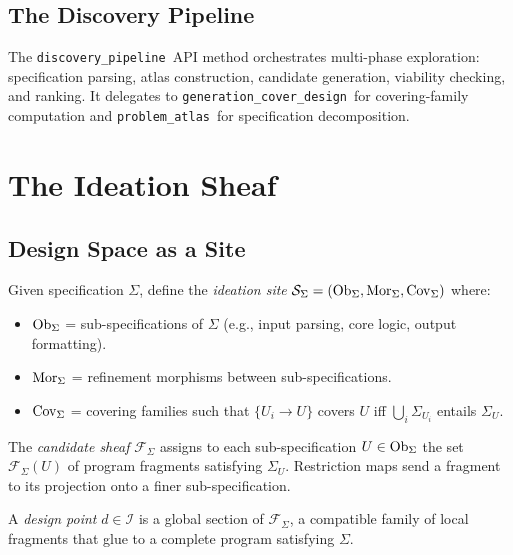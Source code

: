 \documentclass[11pt]{article}
\newcommand{\IdeationSpace}{\mathcal{I}}
\newcommand{\DiscPipe}{\texttt{discovery\_pipeline}}
\newcommand{\GenCover}{\texttt{generation\_cover\_design}}
\newcommand{\ProbAtlas}{\texttt{problem\_atlas}}
\begin{document}
\subsection{The Discovery Pipeline}
The \DiscPipe\ API method orchestrates multi-phase exploration:
specification parsing, atlas construction, candidate generation,
viability checking, and ranking.  It delegates to \GenCover\ for
covering-family computation and \ProbAtlas\ for specification
decomposition.

\section{The Ideation Sheaf}\label{sec:ideation-sheaf}

\subsection{Design Space as a Site}
Given specification $\Sigma$, define the \emph{ideation site}
$\mathcal{S}_\Sigma = (\mathrm{Ob}_\Sigma, \mathrm{Mor}_\Sigma, \mathrm{Cov}_\Sigma)$ where:
\begin{itemize}[noitemsep]
  \item $\mathrm{Ob}_\Sigma$ = sub-specifications of $\Sigma$ (e.g., input
        parsing, core logic, output formatting).
  \item $\mathrm{Mor}_\Sigma$ = refinement morphisms between sub-specifications.
  \item $\mathrm{Cov}_\Sigma$ = covering families such that $\{U_i \to U\}$
        covers $U$ iff $\bigcup_i \Sigma_{U_i}$ entails $\Sigma_U$.
\end{itemize}

\begin{definition}\label{def:candidate-sheaf}
The \emph{candidate sheaf} $\mathcal{F}_\Sigma$ assigns to each
sub-specification $U \in \mathrm{Ob}_\Sigma$ the set $\mathcal{F}_\Sigma(U)$
of program fragments satisfying $\Sigma_U$.  Restriction maps send a
fragment to its projection onto a finer sub-specification.
\end{definition}

\begin{definition}\label{def:design-point}
A \emph{design point} $d \in \IdeationSpace$ is a global section of
$\mathcal{F}_\Sigma$, \ie a compatible family of local fragments that
glue to a complete program satisfying $\Sigma$.
\end{definition}
\end{document}
